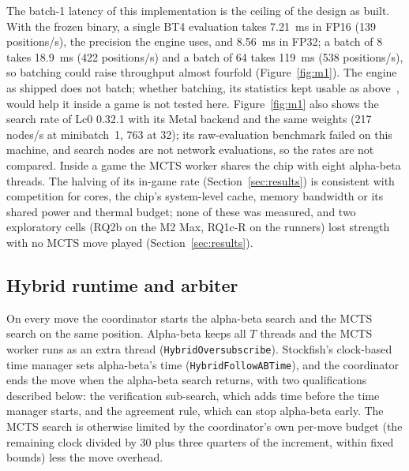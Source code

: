 \documentclass{article}
\begin{document}
The batch-1 latency of this implementation is the ceiling of the design as built. With the frozen binary, a single BT4 evaluation takes 7.21~ms in FP16 (139 positions/s), the precision the engine uses, and 8.56~ms in FP32; a batch of 8 takes 18.9~ms (422 positions/s) and a batch of 64 takes 119~ms (538 positions/s), so batching could raise throughput almost fourfold (Figure~\ref{fig:m1}). The engine as shipped does not batch; whether batching, its statistics kept usable as above~\cite{chaslot2008,liu2020wuuct}, would help it inside a game is not tested here. %
Figure~\ref{fig:m1} also shows the search rate of Lc0 0.32.1 with its Metal backend and the same weights (217 nodes/s at minibatch~1, 763 at 32); its raw-evaluation benchmark failed on this machine, and search nodes are not network evaluations, so the rates are not compared. %
Inside a game the MCTS worker shares the chip with eight alpha-beta threads. The halving of its in-game rate (Section~\ref{sec:results}) is consistent with competition for cores, the chip's system-level cache, memory bandwidth or its shared power and thermal budget; none of these was measured, and two exploratory cells (RQ2b on the M2 Max, RQ1c-R on the runners) lost strength with no MCTS move played (Section~\ref{sec:results}).

\subsection{Hybrid runtime and arbiter}
\label{sec:arbiter}
On every move the coordinator starts the alpha-beta search and the MCTS search on the same position. Alpha-beta keeps all $T$ threads and the MCTS worker runs as an extra thread (\texttt{HybridOversubscribe}). Stockfish's clock-based time manager sets alpha-beta's time (\texttt{HybridFollowABTime}), and the coordinator ends the move when the alpha-beta search returns, with two qualifications described below: the verification sub-search, which adds time before the time manager starts, and the agreement rule, which can stop alpha-beta early. The MCTS search is otherwise limited by the coordinator's own per-move budget (the remaining clock divided by 30 plus three quarters of the increment, within fixed bounds) less the move overhead. %
\end{document}
